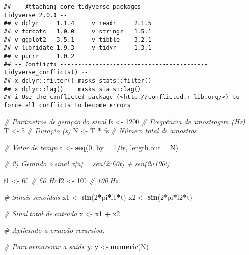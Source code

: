\documentclass[
]{article}
\newenvironment{Shaded}{\begin{snugshade}}{\end{snugshade}}
\newcommand{\AttributeTok}[1]{\textcolor[rgb]{0.13,0.29,0.53}{#1}}
\newcommand{\CommentTok}[1]{\textcolor[rgb]{0.56,0.35,0.01}{\textit{#1}}}
\newcommand{\DecValTok}[1]{\textcolor[rgb]{0.00,0.00,0.81}{#1}}
\newcommand{\FunctionTok}[1]{\textcolor[rgb]{0.13,0.29,0.53}{\textbf{#1}}}
\newcommand{\NormalTok}[1]{#1}
\newcommand{\OtherTok}[1]{\textcolor[rgb]{0.56,0.35,0.01}{#1}}
\newcommand{\SpecialCharTok}[1]{\textcolor[rgb]{0.81,0.36,0.00}{\textbf{#1}}}
\begin{document}
\begin{verbatim}
## -- Attaching core tidyverse packages ------------------------ tidyverse 2.0.0 --
## v dplyr     1.1.4     v readr     2.1.5
## v forcats   1.0.0     v stringr   1.5.1
## v ggplot2   3.5.1     v tibble    3.2.1
## v lubridate 1.9.3     v tidyr     1.3.1
## v purrr     1.0.2     
## -- Conflicts ------------------------------------------ tidyverse_conflicts() --
## x dplyr::filter() masks stats::filter()
## x dplyr::lag()    masks stats::lag()
## i Use the conflicted package (<http://conflicted.r-lib.org/>) to force all conflicts to become errors
\end{verbatim}

\begin{Shaded}
\begin{Highlighting}[]
\CommentTok{\# Parâmetros de geração do sinal}
\NormalTok{fs }\OtherTok{\textless{}{-}} \DecValTok{1200}           \CommentTok{\# Frequência de amostragem (Hz)}
\NormalTok{T }\OtherTok{\textless{}{-}} \DecValTok{5}               \CommentTok{\# Duração (s)}
\NormalTok{N }\OtherTok{\textless{}{-}}\NormalTok{ T }\SpecialCharTok{*}\NormalTok{ fs          }\CommentTok{\# Número total de amostras}

\CommentTok{\# Vetor de tempo}
\NormalTok{t }\OtherTok{\textless{}{-}} \FunctionTok{seq}\NormalTok{(}\DecValTok{0}\NormalTok{, }\AttributeTok{by =} \DecValTok{1}\SpecialCharTok{/}\NormalTok{fs, }\AttributeTok{length.out =}\NormalTok{ N)}

\CommentTok{\# 2) Gerando o sinal x[n] = sen(2π60t) + sen(2π100t)}

\NormalTok{f1 }\OtherTok{\textless{}{-}} \DecValTok{60}             \CommentTok{\# 60 Hz}
\NormalTok{f2 }\OtherTok{\textless{}{-}} \DecValTok{100}            \CommentTok{\# 100 Hz}

\CommentTok{\# Sinais senoidais}
\NormalTok{x1 }\OtherTok{\textless{}{-}} \FunctionTok{sin}\NormalTok{(}\DecValTok{2}\SpecialCharTok{*}\NormalTok{pi}\SpecialCharTok{*}\NormalTok{f1}\SpecialCharTok{*}\NormalTok{t)}
\NormalTok{x2 }\OtherTok{\textless{}{-}} \FunctionTok{sin}\NormalTok{(}\DecValTok{2}\SpecialCharTok{*}\NormalTok{pi}\SpecialCharTok{*}\NormalTok{f2}\SpecialCharTok{*}\NormalTok{t)}

\CommentTok{\# Sinal total de entrada}
\NormalTok{x }\OtherTok{\textless{}{-}}\NormalTok{ x1 }\SpecialCharTok{+}\NormalTok{ x2}

\CommentTok{\# Aplicando a equação recursiva:}

\CommentTok{\# Para armazenar a saída y:}
\NormalTok{y }\OtherTok{\textless{}{-}} \FunctionTok{numeric}\NormalTok{(N)}


\end{Highlighting}
\end{Shaded}
\end{document}

